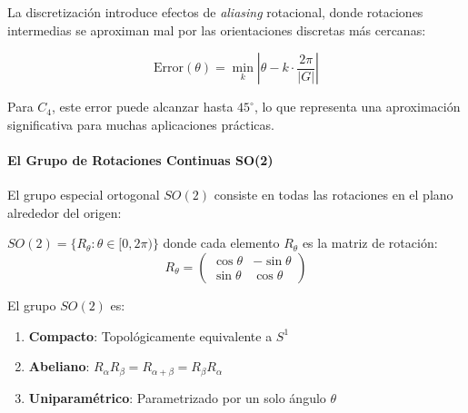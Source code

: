 La discretización introduce efectos de \textit{aliasing} rotacional, donde rotaciones intermedias se aproximan mal por las orientaciones discretas más cercanas:

\begin{equation}
\text{Error}(\theta) = \min_{k} |\theta - k \cdot \frac{2\pi}{|G|}|
\end{equation}

Para $C_4$, este error puede alcanzar hasta $45^{\circ}$, lo que representa una aproximación significativa para muchas aplicaciones prácticas.

\paragraph{El Grupo de Rotaciones Continuas SO(2)}

El grupo especial ortogonal $SO(2)$ consiste en todas las rotaciones en el plano alrededor del origen:

\begin{definition}[Grupo SO(2)]
$SO(2) = \{R_\theta : \theta \in [0, 2\pi)\}$ donde cada elemento $R_\theta$ es la matriz de rotación:
\begin{equation}
R_\theta = \begin{pmatrix}
\cos \theta & -\sin \theta \\
\sin \theta & \cos \theta
\end{pmatrix}
\end{equation}
\end{definition}

\begin{proposition}[Propiedades de SO(2)]
El grupo $SO(2)$ es:
\begin{enumerate}
    \item \textbf{Compacto}: Topológicamente equivalente a $S^1$
    \item \textbf{Abeliano}: $R_\alpha R_\beta = R_{\alpha + \beta} = R_\beta R_\alpha$
    \item \textbf{Uniparamétrico}: Parametrizado por un solo ángulo $\theta$
\end{enumerate}
\end{proposition}

